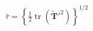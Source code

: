 \documentclass[preview]{standalone}
\begin{document}
\begin{align*}
\bar{\tau} = \left\{ \tfrac{1}{2} \operatorname{tr}(\tilde{\mathbf{T}}'^2) \right\}^{1/2}
\end{align*}
\end{document}
